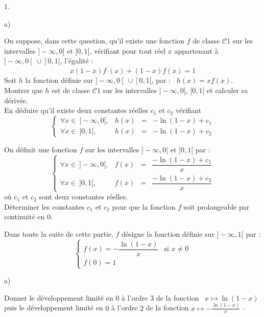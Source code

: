 \documentclass[11pt]{article}%
\begin{document}
\begin{noliste}{1.}
 \setlength{\itemsep}{4mm}
\item 
\begin{noliste}{a)}
 \setlength{\itemsep}{2mm}
\item On suppose, dans cette question, qu'il existe une fonction $f$ de
classe $\mathcal{C}{1}$ sur les intervalles $]-\infty,0[$ et $]0,1[$,
vérifiant pour tout réel $x$ appartenant à $]-\infty,0[ \ \cup ]0,1[
$, l'égalité :
\[
x(1-x)f^{\prime }(x) + (1-x)f(x) = 1
\]
Soit $h$ la fonction définie sur $]-\infty,0[ \ \cup ]0,1[$, par : \
$h(x) = xf(x)$.\\
Montrer que $h$ est de classe $\mathcal{C}{1}$ sur les intervalles
$]-\infty,0[$, $]0,1[$ et calculer sa dérivée.\\
En déduire qu'il existe deux constantes réelles $c_{1}$ et $c_{2}$
vérifiant 
\[
\left\{ 
\begin{array}{cccc}
\forall x\in \ ]-\infty,0[, & h(x) & = & -\ln (1-x) + c_{1} \\
\forall x\in \ ]0,1[, & h(x) & = & -\ln (1-x) + c_{2}
\end{array}
\right. 
\]

\item On définit une fonction $f$ sur les intervalles $]-\infty,0[$ et
$]0,1[$ par :
\[
\left\{ 
\begin{array}{cccc}
\forall x\in \ ]-\infty,0[, & f(x) & = & \dfrac{-\ln (1-x) + c_{1}}{x}
\\
\forall x\in \ ]0,1[, & f(x) & = & \dfrac{-\ln (1-x) + c_{2}}{x}
\end{array}
\right. 
\]
où $c_{1}$ et $c_{2}$ sont deux constantes réelles.\\
Déterminer les constantes $c_{1}$ et $c_{2}$ pour que la fonction $f$
soit prolongeable par continuité en $0$.
\end{noliste}

\item \label{deff} Dans toute la suite de cette partie, $f$ désigne la
fonction définie sur $]-\infty,1[$ par :
\[
\left\{ 
\begin{array}{cc}
f(x) = -\dfrac{\ln (1-x)}{x} & \text{si }x\neq 0 \\
f(0) = 1 & 
\end{array}
\right. 
\]

\begin{noliste}{a)}
 \setlength{\itemsep}{2mm}
\item Donner le développement limité en $0$ à l'ordre $3$ de la
fonction \ $x\mapsto \ln (1-x)$ puis le développement limité en $0$ 
à l'ordre $2$ de la fonction $ x\mapsto -\frac{\ln (1-x)}{x}\;\cdotp$


\end{noliste}
\end{noliste}
\end{document}
